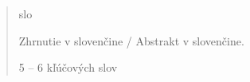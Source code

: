 \begin{abstract}
    \markboth{\abstractname}{}
\begin{scontents}[store-env=lang]
slo
\end{scontents}
\begin{scontents}[store-env=abstracts,print-env=true]
Zhrnutie v slovenčine / Abstrakt v slovenčine.
\end{scontents}

\begin{scontents}[store-env=keywords,print-env=true]
5 – 6 kľúčových slov
\end{scontents}
\end{abstract}
\cleardoublepage
{}
